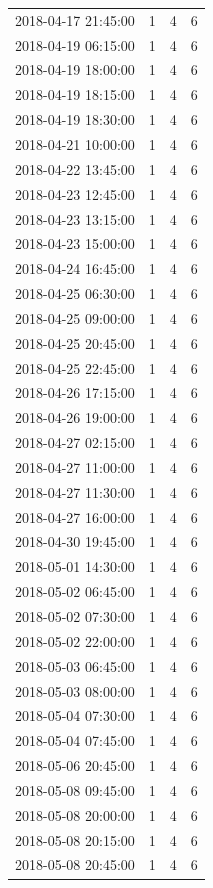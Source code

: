 \begin{tabular}{lrrr}
2018-04-17 21:45:00 & 1 & 4 & 6 \\
2018-04-19 06:15:00 & 1 & 4 & 6 \\
2018-04-19 18:00:00 & 1 & 4 & 6 \\
2018-04-19 18:15:00 & 1 & 4 & 6 \\
2018-04-19 18:30:00 & 1 & 4 & 6 \\
2018-04-21 10:00:00 & 1 & 4 & 6 \\
2018-04-22 13:45:00 & 1 & 4 & 6 \\
2018-04-23 12:45:00 & 1 & 4 & 6 \\
2018-04-23 13:15:00 & 1 & 4 & 6 \\
2018-04-23 15:00:00 & 1 & 4 & 6 \\
2018-04-24 16:45:00 & 1 & 4 & 6 \\
2018-04-25 06:30:00 & 1 & 4 & 6 \\
2018-04-25 09:00:00 & 1 & 4 & 6 \\
2018-04-25 20:45:00 & 1 & 4 & 6 \\
2018-04-25 22:45:00 & 1 & 4 & 6 \\
2018-04-26 17:15:00 & 1 & 4 & 6 \\
2018-04-26 19:00:00 & 1 & 4 & 6 \\
2018-04-27 02:15:00 & 1 & 4 & 6 \\
2018-04-27 11:00:00 & 1 & 4 & 6 \\
2018-04-27 11:30:00 & 1 & 4 & 6 \\
2018-04-27 16:00:00 & 1 & 4 & 6 \\
2018-04-30 19:45:00 & 1 & 4 & 6 \\
2018-05-01 14:30:00 & 1 & 4 & 6 \\
2018-05-02 06:45:00 & 1 & 4 & 6 \\
2018-05-02 07:30:00 & 1 & 4 & 6 \\
2018-05-02 22:00:00 & 1 & 4 & 6 \\
2018-05-03 06:45:00 & 1 & 4 & 6 \\
2018-05-03 08:00:00 & 1 & 4 & 6 \\
2018-05-04 07:30:00 & 1 & 4 & 6 \\
2018-05-04 07:45:00 & 1 & 4 & 6 \\
2018-05-06 20:45:00 & 1 & 4 & 6 \\
2018-05-08 09:45:00 & 1 & 4 & 6 \\
2018-05-08 20:00:00 & 1 & 4 & 6 \\
2018-05-08 20:15:00 & 1 & 4 & 6 \\
2018-05-08 20:45:00 & 1 & 4 & 6 \\

\end{tabular}

